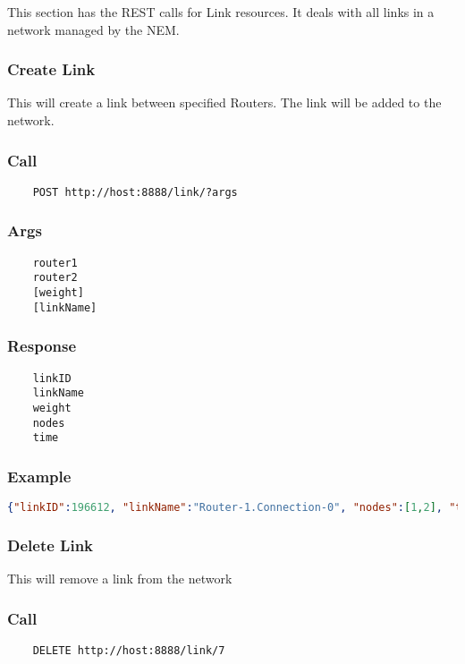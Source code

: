 This section has the REST calls for Link resources.  It deals with all links in a network managed by the NEM.

\hr
\subsubsection{Create Link}
This will create a link between specified Routers. The link will be added to the network.
\subsubsection*{Call}
\begin{verbatim}
	POST http://host:8888/link/?args
\end{verbatim}

\subsubsection*{Args}
\begin{verbatim}
	router1
	router2
	[weight] 
	[linkName]
\end{verbatim}

\subsubsection*{Response}
\begin{verbatim}
	linkID
	linkName
	weight
	nodes
	time
\end{verbatim}

\subsubsection*{Example}
\begin{lstlisting}[language=json]
{"linkID":196612, "linkName":"Router-1.Connection-0", "nodes":[1,2], "time":1362079103160,"weight":10}
\end{lstlisting}


\hr
\subsubsection{Delete Link}
This will remove a link from the network
\subsubsection*{Call}
\begin{verbatim}
	DELETE http://host:8888/link/7
\end{verbatim}

